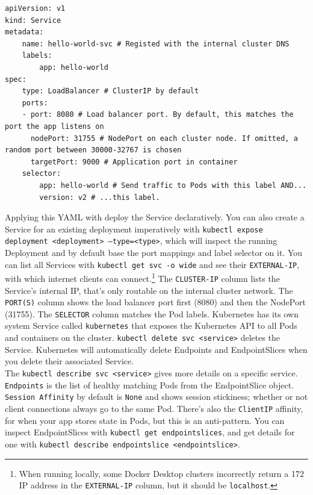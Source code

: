 \documentclass[table, xcdraw]{article}%
\begin{document}
\begin{verbatim}
apiVersion: v1
kind: Service
metadata:
    name: hello-world-svc # Registed with the internal cluster DNS
    labels:
        app: hello-world
spec:
    type: LoadBalancer # ClusterIP by default
    ports:
    - port: 8080 # Load balancer port. By default, this matches the port the app listens on
      nodePort: 31755 # NodePort on each cluster node. If omitted, a random port between 30000-32767 is chosen
      targetPort: 9000 # Application port in container
    selector:
        app: hello-world # Send traffic to Pods with this label AND...
        version: v2 # ...this label.
\end{verbatim}

Applying this YAML with deploy the Service declaratively. You can also create a Service for an existing deployment imperatively with \texttt{kubectl expose deployment <deployment> --type=<type>}, which will inspect the running Deployment and by default base the port mappings and label selector on it. You can list all Services with \texttt{kubectl get svc -o wide} and see their \texttt{EXTERNAL-IP}, with which internet clients can connect.\footnote{When running locally, some Docker Desktop clusters incorrectly return a 172 IP address in the \texttt{EXTERNAL-IP} column, but it should be \texttt{localhost}.} The \texttt{CLUSTER-IP} column lists the Service’s internal IP, that’s only routable on the internal cluster network. The \texttt{PORT(S)} column shows the load balancer port first (8080) and then the NodePort (31755). The \texttt{SELECTOR} column matches the Pod labels. Kubernetes has its own system Service called \texttt{kubernetes} that exposes the Kubernetes API to all Pods and containers on the cluster. \texttt{kubectl delete svc <service>} deletes the Service. Kubernetes will automatically delete Endpoints and EndpointSlices when you delete their associated Service.\\
The \texttt{kubectl describe svc <service>} gives more details on a specific service. \texttt{Endpoints} is the list of healthy matching Pods from the EndpointSlice object. \texttt{Session Affinity} by default is \texttt{None} and shows session stickiness; whether or not client connections always go to the same Pod. There's also the \texttt{ClientIP} affinity, for when your app stores state in Pods, but this is an anti-pattern. You can inspect EndpointSlices with \texttt{kubectl get endpointslices}, and get details for one with \texttt{kubectl describe endpointslice <endpointslice>}.
\end{document}
